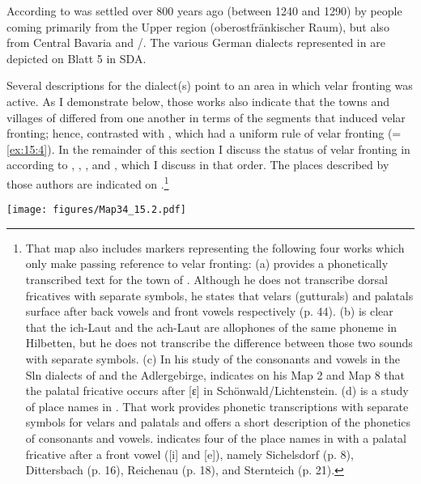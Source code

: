 {According to \citet[909]{Wiesinger1983b}  was settled over 800 years ago (between 1240 and 1290) by people coming primarily from the Upper  region (oberostfränkischer Raum), but also from Central Bavaria and /. The various German dialects represented in  are depicted on Blatt 5 in SDA.

Several descriptions for the  dialect(s) point to an area in which velar fronting was active. As I demonstrate below, those works also indicate that the towns and villages of   differed from one another in terms of the segments that induced velar fronting; hence,   contrasted with , which had a uniform rule of velar fronting (=\ref{ex:15:4}). In the remainder of this section I discuss the status of velar fronting in  according to \citet{Janiczek1911}, \citet{Graebisch1915}, \citet{Seemüller1908c}, and \citet{Benesch1969}, which I discuss in that order. The places described by those authors are indicated on .\footnote{{That map also includes markers representing the following four works which only make passing reference to velar fronting: (a) \citet{Matzke1918} provides a phonetically transcribed text for the town of . Although he does not transcribe dorsal fricatives with separate symbols, he states that velars (gutturals) and palatals surface after back vowels and front vowels respectively (p. 44). (b) \citet[21]{Appel1963} is clear that the ich-Laut and the ach-Laut are allophones of the same phoneme in Hilbetten, but he does not transcribe the difference between those two sounds with separate symbols.  (c) In his study of the consonants and vowels in the Sln dialects of  and the Adlergebirge, \citet{Weiser1937} indicates on his Map 2 and Map 8 that the palatal fricative occurs after [ɛ] in Schönwald/Lichtenstein. (d) \citet{Sandbach1922} is a study of place names in . That work provides phonetic transcriptions with separate symbols for velars and palatals and offers a short description of the phonetics of consonants and vowels.  indicates four of the place names in \citet{Sandbach1922} with a palatal fricative after a front vowel ([i] and [e]), namely Sichelsdorf (p. 8), Dittersbach (p. 16), Reichenau (p. 18), and Sternteich (p. 21).}}

\begin{map}
\texttt{[image: figures/Map34\_15.2.pdf]}
\caption[{Schönhengst}]{. Squares indicate some version of postsonorant velar fronting. 1=\citet{Seemüller1908c}, 2=\citet{Janiczek1911}, 3=\citet{Graebisch1915}, 4=\citet{Matzke1918}, 5=\citet{Sandbach1922}, 6=\citet{Weiser1937}, 7=\citet{Appel1963}, 8=\citet{Benesch1969}.}
\label{map:34}
\end{map}

}

